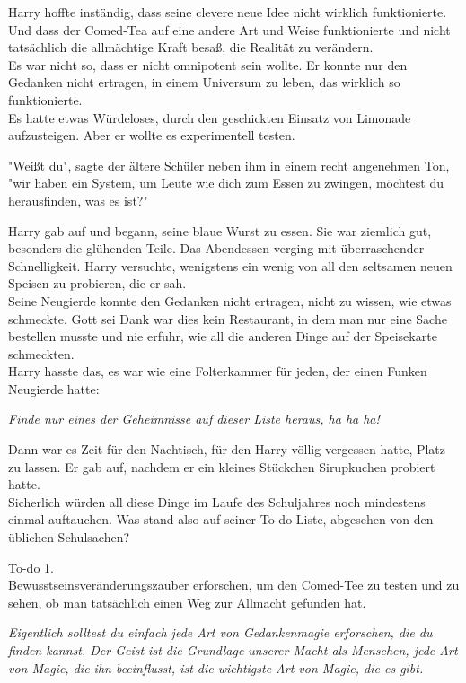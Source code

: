 {Harry hoffte inständig, dass seine clevere neue Idee nicht wirklich funktionierte.\\ Und dass der Comed-Tea auf eine andere Art und Weise funktionierte und nicht tatsächlich die allmächtige Kraft besaß, die Realität zu verändern.\\ Es war nicht so, dass er nicht omnipotent sein wollte. Er konnte nur den Gedanken nicht ertragen, in einem Universum zu leben, das wirklich so funktionierte.\\ Es hatte etwas Würdeloses, durch den geschickten Einsatz von Limonade aufzusteigen. Aber er wollte es experimentell testen.

"Weißt du", sagte der ältere Schüler neben ihm in einem recht angenehmen Ton,\\ "wir haben ein System, um Leute wie dich zum Essen zu zwingen, möchtest du herausfinden, was es ist?"

Harry gab auf und begann, seine blaue Wurst zu essen. Sie war ziemlich gut, besonders die glühenden Teile. Das Abendessen verging mit überraschender Schnelligkeit. Harry versuchte, wenigstens ein wenig von all den seltsamen neuen Speisen zu probieren, die er sah.\\ Seine Neugierde konnte den Gedanken nicht ertragen, nicht zu wissen, wie etwas schmeckte. Gott sei Dank war dies kein Restaurant, in dem man nur eine Sache bestellen musste und nie erfuhr, wie all die anderen Dinge auf der Speisekarte schmeckten.\\ Harry hasste das, es war wie eine Folterkammer für jeden, der einen Funken Neugierde hatte:

\emph{Finde nur eines der Geheimnisse auf dieser Liste heraus, ha ha ha!}

Dann war es Zeit für den Nachtisch, für den Harry völlig vergessen hatte, Platz zu lassen. Er gab auf, nachdem er ein kleines Stückchen Sirupkuchen probiert hatte.\\ Sicherlich würden all diese Dinge im Laufe des Schuljahres noch mindestens einmal auftauchen. Was stand also auf seiner To-do-Liste, abgesehen von den üblichen Schulsachen?

\uline{To-do 1.}\\ Bewusstseinsveränderungszauber erforschen, um den Comed-Tee zu testen und zu sehen, ob man tatsächlich einen Weg zur Allmacht gefunden hat.

\emph{Eigentlich solltest du einfach jede Art von Gedankenmagie erforschen, die du finden kannst. Der Geist ist die Grundlage unserer Macht als Menschen, jede Art von Magie, die ihn beeinflusst, ist die wichtigste Art von Magie, die es gibt.}

}

